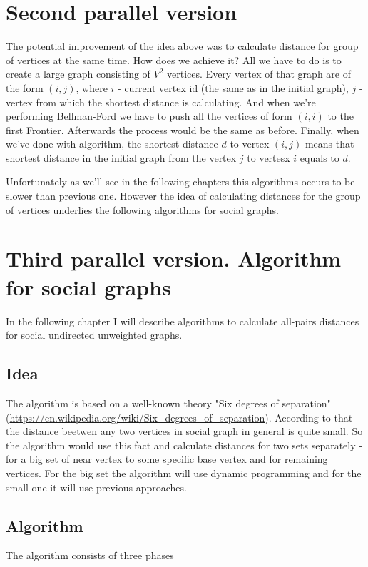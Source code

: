 \FloatBarrier
\section{Second parallel version}

The potential improvement of the idea above was to calculate distance for group of vertices at the same time. How does we achieve it? All we have to do is to create a large graph consisting of $V^2$ vertices. Every vertex of that graph are of the form $(i, j)$, where $i$ - current vertex id (the same as in the initial graph), $j$ - vertex from which the shortest distance is calculating. And when we're performing Bellman-Ford we have to push all the vertices of form $(i, i)$ to the first Frontier. Afterwards the process would be the same as before. Finally, when we've done with algorithm, the shortest distance $d$ to vertex $(i, j)$ means that shortest distance in the initial graph from the vertex $j$ to vertesx $i$ equals to $d$.

Unfortunately as we'll see in the following chapters this algorithms occurs to be slower than previous one. However the idea of calculating distances for the group of vertices underlies the following algorithms for social graphs. 

\FloatBarrier
\section{Third parallel version. Algorithm for social graphs}
In the following chapter I will describe algorithms to calculate all-pairs distances for social undirected unweighted graphs.   

\FloatBarrier
\subsection{Idea}
The algorithm is based on a well-known theory "Six degrees of separation" (\url{https://en.wikipedia.org/wiki/Six_degrees_of_separation}). According to that the distance beetwen any two vertices in social graph in general is quite small. So the algorithm would use this fact and calculate distances for two sets separately - for a big set of near vertex to some specific base vertex and for remaining vertices. For the big set the algorithm will use dynamic programming and for the small one it will use previous approaches. 

\FloatBarrier
\subsection{Algorithm}
The algorithm consists of three phases

